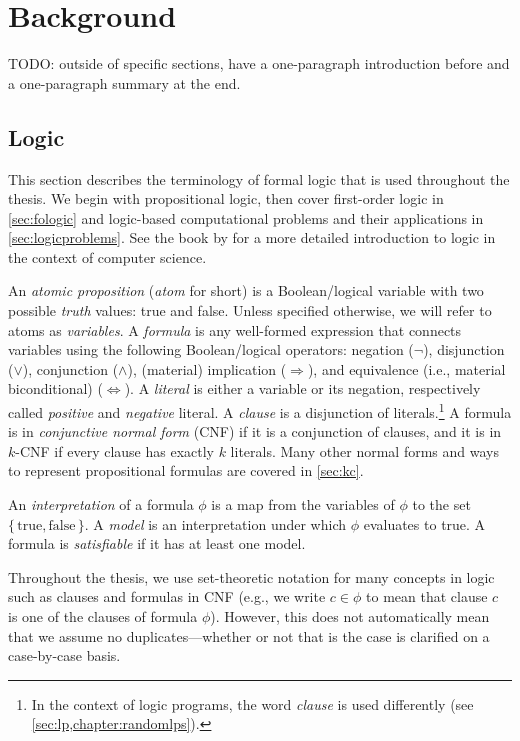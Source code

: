 \chapter{Background}

TODO: outside of specific sections, have a one-paragraph introduction before and a one-paragraph summary at the end.

\section{Logic}

This section describes the terminology of formal logic that is used throughout the thesis. We begin with propositional logic, then cover first-order logic in \cref{sec:fologic} and logic-based computational problems and their applications in \cref{sec:logicproblems}. See the book by \cite{DBLP:books/daglib/0029942} for a more detailed introduction to logic in the context of computer science.

An \emph{atomic proposition} (\emph{atom} for short) is a Boolean/logical variable with two possible \emph{truth} values: true and false. Unless specified otherwise, we will refer to atoms as \emph{variables}. A \emph{formula} is any well-formed expression that connects variables using the following Boolean/logical operators: negation ($\neg$), disjunction ($\lor$), conjunction ($\land$), (material) implication ($\Rightarrow$), and equivalence (i.e., material biconditional) ($\Leftrightarrow$). A \emph{literal} is either a variable or its negation, respectively called \emph{positive} and \emph{negative} literal. A \emph{clause} is a disjunction of literals.\footnote{In the context of logic programs, the word \emph{clause} is used differently (see \cref{sec:lp,chapter:randomlps}).} A formula is in \emph{conjunctive normal form} (CNF) if it is a conjunction of clauses, and it is in $k$-CNF if every clause has exactly $k$ literals. Many other normal forms and ways to represent propositional formulas are covered in \cref{sec:kc}.

An \emph{interpretation} of a formula $\phi$ is a map from the variables of $\phi$ to the set $\{\, \text{true}, \text{false} \,\}$. A \emph{model} is an interpretation under which $\phi$ evaluates to true. A formula is \emph{satisfiable} if it has at least one model.

Throughout the thesis, we use set-theoretic notation for many concepts in logic such as clauses and formulas in CNF (e.g., we write $c \in \phi$ to mean that clause $c$ is one of the clauses of formula $\phi$). However, this does not automatically mean that we assume no duplicates---whether or not that is the case is clarified on a case-by-case basis.

